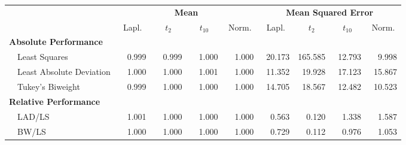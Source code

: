 %
\begin{center}
\begin{tabular}{|l||c|c|c|c||c|c|c|c|} \hline
\multicolumn{1}{|l||}{\bf }&\multicolumn{4}{c||}{\bf Mean}&\multicolumn{4}{c|}{\bf Mean Squared Error}\\ \cline{2-9}
\multicolumn{1}{|l||}{}&\multicolumn{1}{c|}{Lapl.}&\multicolumn{1}{c|}{$t_2$}&\multicolumn{1}{c|}{$t_{10}$}&\multicolumn{1}{c||}{Norm.}&\multicolumn{1}{c|}{Lapl.}&\multicolumn{1}{c|}{$t_2$}&\multicolumn{1}{c|}{$t_{10}$}&\multicolumn{1}{c|}{Norm.}\\ \hline
{\bf Absolute Performance}&&&&&&&&\\
~~Least Squares&~~0.999&~~0.999&~~1.000&~~1.000&~20.173&165.585&~12.793&~~9.998\\ 
~~Least Absolute Deviation&~~1.000&~~1.000&~~1.001&~~1.000&~11.352&~19.928&~17.123&~15.867\\ 
~~Tukey's Biweight&~~0.999&~~1.000&~~1.000&~~1.000&~14.705&~18.567&~12.482&~10.523\\ \hline
{\bf Relative Performance}&&&&&&&&\\
~~LAD/LS&~~1.001&~~1.000&~~1.000&~~1.000&~~0.563&~~0.120&~~1.338&~~1.587\\ 
~~BW/LS&~~1.000&~~1.000&~~1.000&~~1.000&~~0.729&~~0.112&~~0.976&~~1.053\\ 
\hline
\end{tabular}
\end{center}
